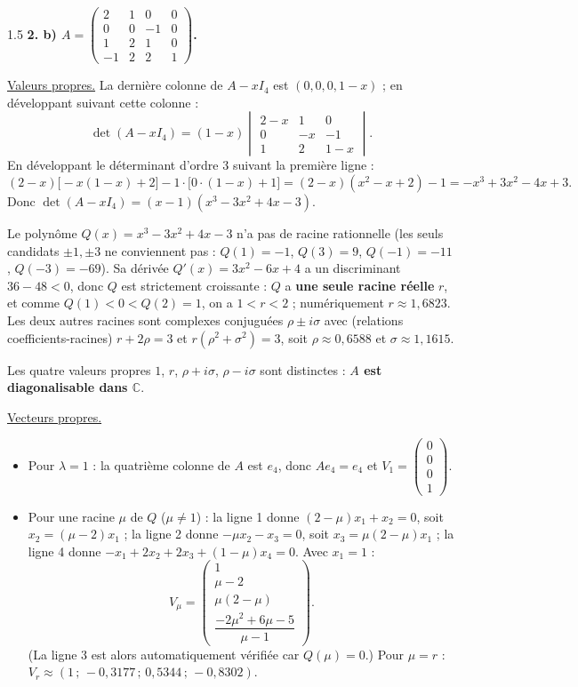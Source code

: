 \documentclass[12pt]{article}
\begin{document}
\begin{spacing}{1.5}
\textbf{2. b) $A=\begin{pmatrix}
2 & 1 & 0 & 0 \\
0 & 0 & -1 & 0 \\
1 & 2 & 1 & 0 \\
-1 & 2 & 2 & 1
\end{pmatrix}$.}

\underline{Valeurs propres.} La dernière colonne de $A-xI_4$ est $(0,0,0,1-x)$ ; en développant suivant cette colonne :
\[
\det(A-xI_4)=(1-x)\begin{vmatrix}
2-x & 1 & 0\\
0 & -x & -1\\
1 & 2 & 1-x
\end{vmatrix}.
\]
En développant le déterminant d'ordre 3 suivant la première ligne :
\[
(2-x)\big[-x(1-x)+2\big]-1\cdot\big[0\cdot(1-x)+1\big]=(2-x)(x^2-x+2)-1=-x^3+3x^2-4x+3 .
\]
Donc $\det(A-xI_4)=(x-1)(x^3-3x^2+4x-3)$.

Le polynôme $Q(x)=x^3-3x^2+4x-3$ n'a pas de racine rationnelle (les seuls candidats $\pm1,\pm3$ ne conviennent pas : $Q(1)=-1$, $Q(3)=9$, $Q(-1)=-11$, $Q(-3)=-69$). Sa dérivée $Q'(x)=3x^2-6x+4$ a un discriminant $36-48<0$, donc $Q$ est strictement croissante : $Q$ a \textbf{une seule racine réelle} $r$, et comme $Q(1)<0<Q(2)=1$, on a $1<r<2$ ; numériquement $r\approx1{,}6823$. Les deux autres racines sont complexes conjuguées $\rho\pm i\sigma$ avec (relations coefficients-racines) $r+2\rho=3$ et $r(\rho^2+\sigma^2)=3$, soit $\rho\approx0{,}6588$ et $\sigma\approx1{,}1615$.

Les quatre valeurs propres $1$, $r$, $\rho+i\sigma$, $\rho-i\sigma$ sont distinctes : \textbf{$A$ est diagonalisable dans $\mathbb{C}$}.

\underline{Vecteurs propres.}
\begin{itemize}
\item Pour $\lambda=1$ : la quatrième colonne de $A$ est $e_4$, donc $Ae_4=e_4$ et $V_1=\begin{pmatrix}0\\0\\0\\1\end{pmatrix}$.
\item Pour une racine $\mu$ de $Q$ ($\mu\neq1$) : la ligne 1 donne $(2-\mu)x_1+x_2=0$, soit $x_2=(\mu-2)x_1$ ; la ligne 2 donne $-\mu x_2-x_3=0$, soit $x_3=\mu(2-\mu)x_1$ ; la ligne 4 donne $-x_1+2x_2+2x_3+(1-\mu)x_4=0$. Avec $x_1=1$ :
\[
V_\mu=\begin{pmatrix}1\\ \mu-2\\ \mu(2-\mu)\\ \dfrac{-2\mu^2+6\mu-5}{\mu-1}\end{pmatrix}.
\]
(La ligne 3 est alors automatiquement vérifiée car $Q(\mu)=0$.) Pour $\mu=r$ : $V_r\approx(1\,;\,-0{,}3177\,;\,0{,}5344\,;\,-0{,}8302)$.
\end{itemize}


\end{spacing}
\end{document}
